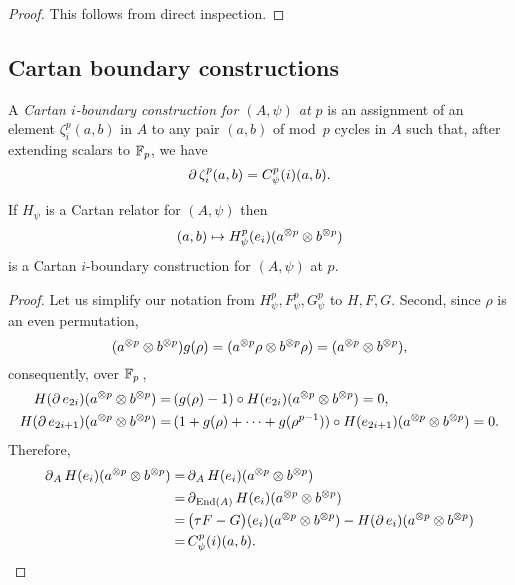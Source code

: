 \begin{proof}
	This follows from direct inspection.
\end{proof}

\subsection{Cartan boundary constructions}\label{ss:cartan_coboundary}

A \textit{Cartan $i$-boundary construction for $(A,\psi)$ at $p$} is an assignment of an element $\zeta_i^p(a,b)$ in $A$ to any pair $(a,b)$ of mod~$p$ cycles in $A$ such that, after extending scalars to ${\mathbb{F}_p}$, we have
\[
\operatorname{\partial} \zeta_i^p(a,b) = C_\psi^p(i)(a, b).
\]

\begin{theorem}
	If $H_\psi$ is a Cartan relator for $(A, \psi)$ then
	\[
	(a,b) \mapsto H_\psi^p(e_i)(a^{\otimes p} \otimes b^{\otimes p})
	\]
	is a Cartan $i$-boundary construction for $(A, \psi)$ at $p$.
\end{theorem}

\begin{proof}
	Let us simplify our notation from $H_\psi^p, F_\psi^p, G_\psi^p$ to $H, F, G$.
	Second, since $\rho$ is an even permutation,
	\[
	(a^{\otimes p} \otimes b^{\otimes p}) g(\rho) = (a^{\otimes p} \rho \otimes b^{\otimes p} \rho ) = (a^{\otimes p} \otimes b^{\otimes p}),
	\]
	consequently, over ${\mathbb{F}_p}$\,,
	\begin{align*}
		H(\operatorname{\partial} e_{2i})(a^{\otimes p} \otimes b^{\otimes p}) =&\,
		(g(\rho) - 1) \mathbin{\circ} H(e_{2i})(a^{\otimes p} \otimes b^{\otimes p}) = 0, \\
		H(\operatorname{\partial} e_{2i+1})(a^{\otimes p} \otimes b^{\otimes p}) =&\,
		(1+g(\rho)+\dots+g(\rho^{p-1})) \mathbin{\circ} H(e_{2i+1})(a^{\otimes p} \otimes b^{\otimes p}) = 0.
	\end{align*}
	Therefore,
	\begin{align*}
		\operatorname{\partial}_A H(e_i)(a^{\otimes p} \otimes b^{\otimes p}) =&
		\operatorname{\partial}_A H(e_i)(a^{\otimes p} \otimes b^{\otimes p}) \\ =&
		\operatorname{\partial}_{\mathrm{End}(A)} H(e_i)(a^{\otimes p} \otimes b^{\otimes p}) \\ =& \,
		\big(\tau F - G\big)(e_i)(a^{\otimes p} \otimes b^{\otimes p}) -
		H(\operatorname{\partial} e_i)(a^{\otimes p} \otimes b^{\otimes p}) \\ =&\,
		C^p_\psi(i)(a,b).\qedhere
	\end{align*}
\end{proof}